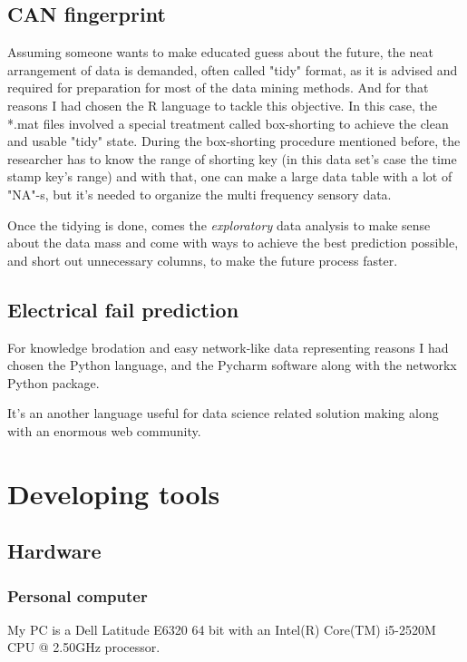 		\subsection{CAN fingerprint}
				\noindent
Assuming someone wants to make educated guess about the future, the neat arrangement of data is demanded, often called "tidy" format, as it is advised and required for preparation for most of the data mining methods. And for that reasons I had chosen the R language to tackle this objective.
				\noindent
In this case, the *.mat files involved a special treatment called box-shorting to achieve the clean and usable "tidy" state. During the box-shorting procedure mentioned before, the researcher has to know the range of shorting key (in this data set's case the time stamp key's range) and with that, one can make a large data table with a lot of "NA"-s, but it's needed to organize the multi frequency sensory data.

Once the tidying is done, comes the \textit{exploratory} data analysis to make sense about the data mass and come with ways to achieve the best prediction possible, and short out unnecessary columns, to make the future process faster.
		\subsection{Electrical fail prediction}
For knowledge brodation and easy network-like data representing reasons I had chosen the Python language, and the Pycharm software along with the networkx Python package.

It's an another language useful for data science related solution making along with an enormous web community.
	\section{Developing tools}
		\subsection{Hardware}
			\subsubsection{Personal computer}
My PC is a Dell Latitude E6320 64 bit with an Intel(R) Core(TM) i5-2520M CPU @ 2.50GHz processor.
\cite{Latitude}
